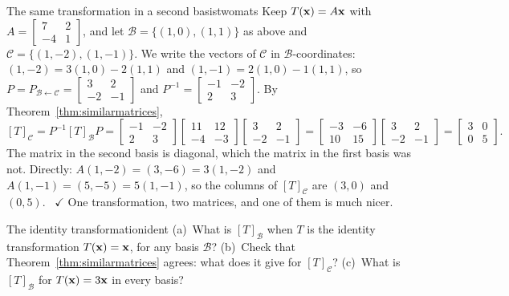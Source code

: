 \documentclass[11pt]{article}
\begin{document}
\begin{exmp}{The same transformation in a second basis}{twomats}
Keep $T(\mathbf{x})=A\mathbf{x}$ with $A=\begin{bmatrix}7&2\\-4&1\end{bmatrix}$, and let $\mathcal{B}=\{(1,0),(1,1)\}$ as above and $\mathcal{C}=\{(1,-2),(1,-1)\}$. We write the vectors of $\mathcal{C}$ in $\mathcal{B}$-coordinates: $(1,-2)=3(1,0)-2(1,1)$ and $(1,-1)=2(1,0)-1(1,1)$, so $P=P_{\mathcal{B}\leftarrow\mathcal{C}}=\begin{bmatrix}3&2\\-2&-1\end{bmatrix}$ and $P^{-1}=\begin{bmatrix}-1&-2\\2&3\end{bmatrix}$. By Theorem~\ref{thm:similarmatrices},
\[
[T]_{\mathcal{C}}=P^{-1}[T]_{\mathcal{B}}P=\begin{bmatrix}-1&-2\\2&3\end{bmatrix}\begin{bmatrix}11&12\\-4&-3\end{bmatrix}\begin{bmatrix}3&2\\-2&-1\end{bmatrix}=\begin{bmatrix}-3&-6\\10&15\end{bmatrix}\begin{bmatrix}3&2\\-2&-1\end{bmatrix}=\begin{bmatrix}3&0\\0&5\end{bmatrix}.
\]
The matrix in the second basis is diagonal, which the matrix in the first basis was not. Directly: $A(1,-2)=(3,-6)=3(1,-2)$ and $A(1,-1)=(5,-5)=5(1,-1)$, so the columns of $[T]_{\mathcal{C}}$ are $(3,0)$ and $(0,5)$. \ $\checkmark$ One transformation, two matrices, and one of them is much nicer.
\end{exmp}

\begin{think}{The identity transformation}{ident}
(a)~What is $[T]_{\mathcal{B}}$ when $T$ is the identity transformation $T(\mathbf{x})=\mathbf{x}$, for any basis $\mathcal{B}$? (b)~Check that Theorem~\ref{thm:similarmatrices} agrees: what does it give for $[T]_{\mathcal{C}}$? (c)~What is $[T]_{\mathcal{B}}$ for $T(\mathbf{x})=3\mathbf{x}$ in every basis?
\end{think}
\end{document}
